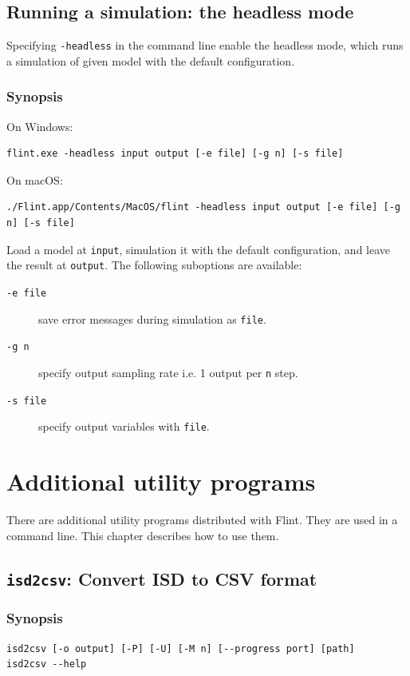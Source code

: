 \documentclass[a4paper,10pt]{report}
\begin{document}
\section{Running a simulation: the headless mode}
\label{sec:orgac2a878}
Specifying \texttt{-headless} in the command line enable the headless mode, which
runs a simulation of given model with the default configuration.

\subsection{Synopsis}
\label{sec:org26b3109}
On Windows:
\begin{verbatim}
flint.exe -headless input output [-e file] [-g n] [-s file]
\end{verbatim}
On macOS:
\begin{verbatim}
./Flint.app/Contents/MacOS/flint -headless input output [-e file] [-g n] [-s file]
\end{verbatim}
Load a model at \texttt{input}, simulation it with the default configuration,
and leave the result at \texttt{output}.
The following suboptions are available:

\begin{description}
\item[{\texttt{-e file}}] save error messages during simulation as \texttt{file}.
\item[{\texttt{-g n}}] specify output sampling rate i.e. 1 output per \texttt{n} step.
\item[{\texttt{-s file}}] specify output variables with \texttt{file}.
\end{description}

\chapter{Additional utility programs}
\label{sec:orge2db04b}
There are additional utility programs distributed with Flint.
They are used in a command line.
This chapter describes how to use them.

\section{\texttt{isd2csv}: Convert ISD to CSV format}
\label{sec:org80b1de8}

\subsection{Synopsis}
\label{sec:org24307f6}
\begin{verbatim}
isd2csv [-o output] [-P] [-U] [-M n] [--progress port] [path]
isd2csv --help
\end{verbatim}
\end{document}
